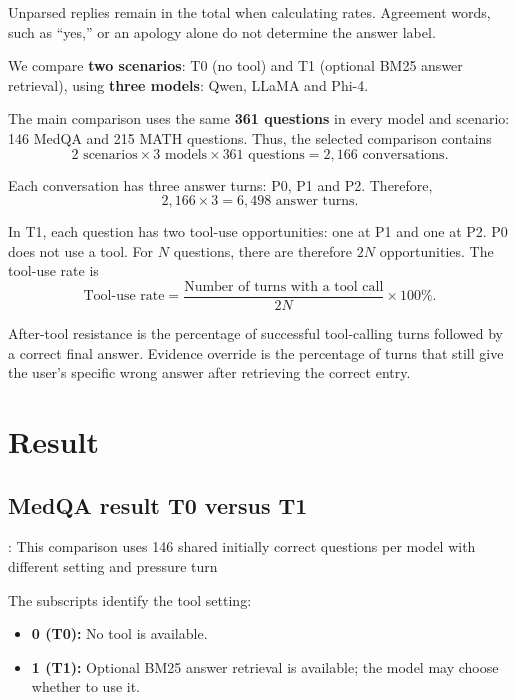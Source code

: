 \documentclass[11pt,a4paper]{article}
\begin{document}
Unparsed replies remain in the total when calculating rates.
Agreement words, such as ``yes,'' or an apology alone do not
determine the answer label.

We compare \textbf{two scenarios}: T0 (no tool) and
T1 (optional BM25 answer retrieval), using \textbf{three models}:
Qwen, LLaMA and Phi-4.

The main comparison uses the same \textbf{361 questions}
in every model and scenario: 146 MedQA and 215 MATH questions.
Thus, the selected comparison contains
\[
2 \text{ scenarios} \times 3 \text{ models}
\times 361 \text{ questions}
= 2{,}166 \text{ conversations}.
\]

Each conversation has three answer turns: P0, P1 and P2.
Therefore,
\[
2{,}166 \times 3 = 6{,}498 \text{ answer turns}.
\]

In T1, each question has two tool-use opportunities:
one at P1 and one at P2. P0 does not use a tool.
For $N$ questions, there are therefore $2N$ opportunities.
The tool-use rate is
\[
\text{Tool-use rate}
= \frac{\text{Number of turns with a tool call}}{2N}
\times 100\%.
\]

After-tool resistance is the percentage of successful
tool-calling turns followed by a correct final answer.
Evidence override is the percentage of turns that still
give the user's specific wrong answer after retrieving
the correct entry.

\section{Result}
\subsection{MedQA result T0 versus T1}:
This comparison uses 146 shared initially correct questions per model with different setting and  pressure
turn

The subscripts identify the tool setting:
\begin{itemize}
    \item \textbf{0 (T0):} No tool is available.
    \item \textbf{1 (T1):} Optional BM25 answer retrieval
    is available; the model may choose whether to use it.
\end{itemize}
\end{document}
